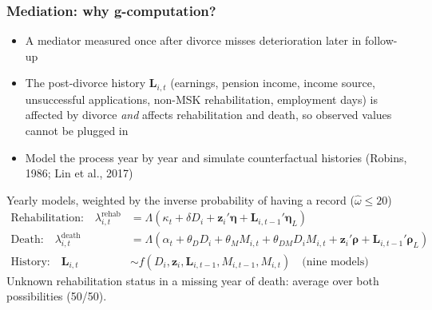 \documentclass[t,20pt]{beamer}
\newcommand{\ct}[1]{{\color{BiBBlau80}(#1)}}                        %
\newcommand{\Lam}{\Lambda}
\begin{document}
\begin{bibframe}
  \frametitle{Mediation: why g-computation?}
  {\small
  \begin{itemize}
    \item A mediator measured once after divorce misses deterioration later in follow-up
    \item The post-divorce history $\mathbf{L}_{i,t}$ (earnings, pension income, income source, unsuccessful applications, non-MSK rehabilitation, employment days) is affected by divorce \textit{and} affects rehabilitation and death, so observed values cannot be plugged in
    \item[$\rightarrow$] Model the process year by year and simulate counterfactual histories \ct{Robins, 1986; Lin et al., 2017}
  \end{itemize}
  }
  \begin{block}{Yearly models, weighted by the inverse probability of having a record ($\hat\omega \leq 20$)}
    \vspace{-0.3cm}
    {\small
    \begin{align*}
      \text{Rehabilitation:}\quad \lambda^{\text{rehab}}_{i,t} &= \Lam\left(\kappa_t + \delta D_i + \mathbf{z}_i'\boldsymbol{\eta} + \mathbf{L}_{i,t-1}'\boldsymbol{\eta}_L\right)\\
      \text{Death:}\quad \lambda^{\text{death}}_{i,t} &= \Lam\left(\alpha_t + \theta_D D_i + \theta_M M_{i,t} + \theta_{DM} D_i M_{i,t} + \mathbf{z}_i'\boldsymbol{\rho} + \mathbf{L}_{i,t-1}'\boldsymbol{\rho}_L\right)\\
      \text{History:}\quad \mathbf{L}_{i,t} &\sim f\left(D_i, \mathbf{z}_i, \mathbf{L}_{i,t-1}, M_{i,t-1}, M_{i,t}\right) \quad \text{(nine models)}
    \end{align*}
    }
    \vspace{-0.3cm}
    {\footnotesize Unknown rehabilitation status in a missing year of death: average over both possibilities (50/50).}
  \end{block}
\end{bibframe}
\end{document}
